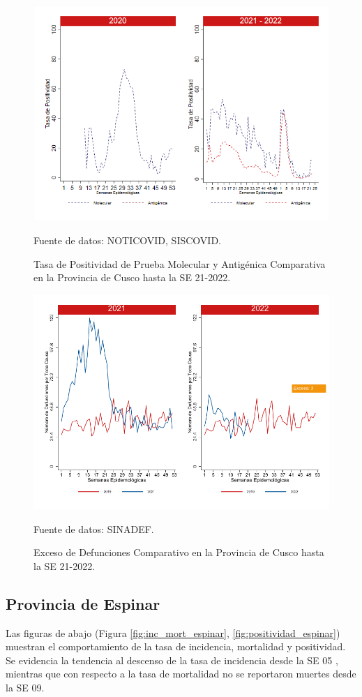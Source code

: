\documentclass[12pt,a4paper,openany]{book}
\begin{document}
	\begin{figure}[h]
		\caption{Tasa de Positividad de Prueba Molecular y Antigénica Comparativa en la Provincia de Cusco hasta la SE 21-2022.}\label{fig:positividad_cusco}
		\begin{center}
			\includegraphics[width=0.7\linewidth]{../figuras/positividad_20_21_7.png}
		\end{center}
		{\footnotesize {Fuente de datos: NOTICOVID, SISCOVID.}}
	\end{figure}
	
	\begin{figure}[h]
		\caption{Exceso de Defunciones Comparativo en la Provincia de Cusco hasta la SE 21-2022.}\label{fig:exceso_cusco}
		\begin{center}
			\includegraphics[width=0.7\linewidth]{../figuras/exceso_7.pdf}
		\end{center}
		{\footnotesize {Fuente de datos: SINADEF.}}
	\end{figure}
	
	\clearpage
	
	\subsection*{Provincia de Espinar}
	\noindent Las figuras de abajo (Figura \ref{fig:inc_mort_espinar}, \ref{fig:positividad_espinar}) muestran el comportamiento de la tasa de incidencia, mortalidad y positividad. Se evidencia la tendencia al descenso de la tasa de incidencia desde la SE 05 , mientras que con respecto a la tasa de mortalidad no se reportaron muertes desde la SE 09. 
	
\end{document}
